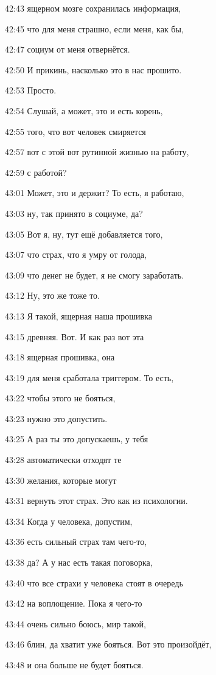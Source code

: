 42:43
ящерном мозге сохранилась информация,

42:45
что для меня страшно, если меня, как бы,

42:47
социум от меня отвернётся.

42:50
И прикинь, насколько это в нас прошито.

42:53
Просто.

42:54
Слушай, а может, это и есть корень,

42:55
того, что вот человек смиряется

42:57
вот с этой вот рутинной жизнью на работу,

42:59
с работой?

43:01
Может, это и держит? То есть, я работаю,

43:03
ну, так принято в социуме, да?

43:05
Вот я, ну, тут ещё добавляется того,

43:07
что страх, что я умру от голода,

43:09
что денег не будет, я не смогу заработать.

43:12
Ну, это же тоже то.

43:13
Я такой, ящерная наша прошивка

43:15
древняя. Вот. И как раз вот эта

43:18
ящерная прошивка, она

43:19
для меня сработала триггером. То есть,

43:22
чтобы этого не бояться,

43:23
нужно это допустить.

43:25
А раз ты это допускаешь, у тебя

43:28
автоматически отходят те

43:30
желания, которые могут

43:31
вернуть этот страх. Это как из психологии.

43:34
Когда у человека, допустим,

43:36
есть сильный страх там чего-то,

43:38
да? А у нас есть такая поговорка,

43:40
что все страхи у человека стоят в очередь

43:42
на воплощение. Пока я чего-то

43:44
очень сильно боюсь, мир такой,

43:46
блин, да хватит уже бояться. Вот это произойдёт,

43:48
и она больше не будет бояться.

